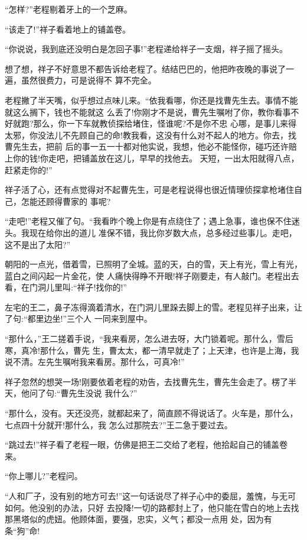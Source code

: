 \documentclass[11pt,a4paper,onecolumn]{article}
\begin{document}
``怎样?''老程剔着牙上的一个芝麻。

``该走了!''祥子看着地上的铺盖卷。

``你说说，我到底还没明白是怎回子事!''老程递给祥子一支烟，祥子摇了摇头。

想了想，祥子不好意思不都告诉给老程了。结结巴巴的，他把昨夜晚的事说了一遍，虽然很费力，可是说得不
算不完全。

老程撇了半天嘴，似乎想过点味儿来。``依我看哪，你还是找曹先生去。事情不能就这么搁下，钱也不能就这
么丢了!你刚才不是说，曹先生嘱咐了你，教你看事不好就跑?那么，你一下车就教侦探给堵住，怪谁呢?不是你不忠
心哪，是事儿来得太邪，你没法儿不先顾自己的命!教我看，这没有什么对不起人的地方。你去，找曹先生去，把前
后的事一五一十都对他实说，我想，他必不能怪你，碰巧还许赔上你的钱!你走吧，把铺盖放在这儿，早早的找他去。
天短，一出太阳就得八点，赶紧走你的!''

祥子活了心，还有点觉得对不起曹先生，可是老程说得也很近情理\myrule 侦探拿枪堵住自己，怎能还顾得曹家的
事呢?

``走吧!''老程又催了句。``我看昨个晚上你是有点绕住了；遇上急事，谁也保不住迷头。我现在给你出的道儿
准保不错，我比你岁数大点，总多经过些事儿。走吧，这不是出了太阳?''

朝阳的一点光，借着雪，已照明了全城。蓝的天，白的雪，天上有光，雪上有光，蓝白之间闪起一片金花，使
人痛快得睁不开眼!祥子刚要走，有人敲门。老程出去看，在门洞儿里叫:``祥子!找你的!''

左宅的王二，鼻子冻得滴着清水，在门洞儿里跺去脚上的雪。老程见祥子出来，让了句:``都里边坐!''三个人
一同来到屋中。

``那什么，''王二搓着手说，``我来看房，怎么进去呀，大门锁着呢。那什么，雪后寒，真冷!那什么，曹先
生，曹太太，都一清早就走了；上天津，也许是上海，我说不清。左先生嘱咐我来看房。那什么，可真冷!''

祥子忽然的想哭一场!刚要依着老程的劝告，去找曹先生，曹先生会走了。楞了半天，他问了句:``曹先生没说
我什么?''

``那什么，没有。天还没亮，就都起来了，简直顾不得说话了。火车是，那什么，七点四十分就开!那什么，我
怎么过那院去?''王二急于要过去。

``跳过去!''祥子看了老程一眼，仿佛是把王二交给了老程，他拾起自己的铺盖卷来。

``你上哪儿?''老程问。

``人和厂子，没有别的地方可去!''这一句话说尽了祥子心中的委屈，羞愧，与无可如何。他没别的办法，只好
去投降!一切的路都封上了，他只能在雪白的地上去找那黑塔似的虎妞。他顾体面，要强，忠实，义气；都没一点用
处，因为有条``狗''命!
\end{document}
